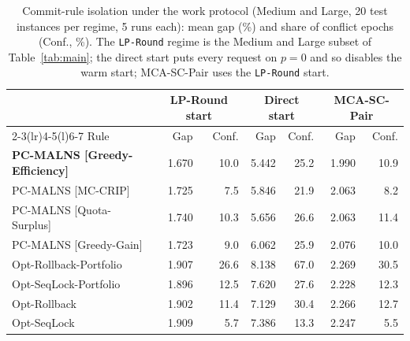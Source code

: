 \begin{table}[pos=!htb]
\centering
\caption{Commit-rule isolation under the work protocol (Medium and Large, 20 test instances per regime, 5 runs each): mean gap (\%) and share of conflict epochs (Conf., \%). The \texttt{LP-Round} regime is the Medium and Large subset of Table~\ref{tab:main}; the direct start puts every request on $p = 0$ and so disables the warm start; MCA-SC-Pair uses the \texttt{LP-Round} start.}
\label{tab:commit}
\footnotesize
\begin{tabular}{@{}lrrrrrr@{}}
\toprule
 & \multicolumn{2}{c}{LP-Round start} & \multicolumn{2}{c}{Direct start} & \multicolumn{2}{c}{MCA-SC-Pair} \\
\cmidrule(lr){2-3}\cmidrule(lr){4-5}\cmidrule(l){6-7}
Rule & Gap & Conf. & Gap & Conf. & Gap & Conf. \\
\midrule
\textbf{PC-MALNS [Greedy-Efficiency]} & 1.670 & 10.0 & 5.442 & 25.2 & 1.990 & 10.9 \\
PC-MALNS [MC-CRIP] & 1.725 & 7.5 & 5.846 & 21.9 & 2.063 & 8.2 \\
PC-MALNS [Quota-Surplus] & 1.740 & 10.3 & 5.656 & 26.6 & 2.063 & 11.4 \\
PC-MALNS [Greedy-Gain] & 1.723 & 9.0 & 6.062 & 25.9 & 2.076 & 10.0 \\
Opt-Rollback-Portfolio & 1.907 & 26.6 & 8.138 & 67.0 & 2.269 & 30.5 \\
Opt-SeqLock-Portfolio & 1.896 & 12.5 & 7.620 & 27.6 & 2.228 & 12.3 \\
Opt-Rollback & 1.902 & 11.4 & 7.129 & 30.4 & 2.266 & 12.7 \\
Opt-SeqLock & 1.909 & 5.7 & 7.386 & 13.3 & 2.247 & 5.5 \\
\bottomrule
\end{tabular}
\end{table}
